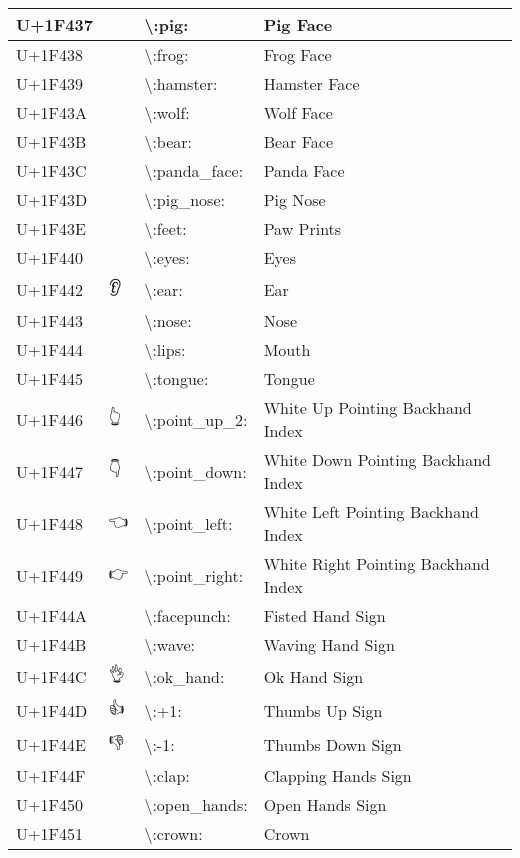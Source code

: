 \begin{table}[h]
\begin{tabulary}{\linewidth}{|L|L|L|L|}
\hline
U+1F437 & 🐷 & {\textbackslash}:pig: & Pig Face \\
\hline
U+1F438 & 🐸 & {\textbackslash}:frog: & Frog Face \\
\hline
U+1F439 & 🐹 & {\textbackslash}:hamster: & Hamster Face \\
\hline
U+1F43A & 🐺 & {\textbackslash}:wolf: & Wolf Face \\
\hline
U+1F43B & 🐻 & {\textbackslash}:bear: & Bear Face \\
\hline
U+1F43C & 🐼 & {\textbackslash}:panda\_face: & Panda Face \\
\hline
U+1F43D & 🐽 & {\textbackslash}:pig\_nose: & Pig Nose \\
\hline
U+1F43E & 🐾 & {\textbackslash}:feet: & Paw Prints \\
\hline
U+1F440 & 👀 & {\textbackslash}:eyes: & Eyes \\
\hline
U+1F442 & 👂 & {\textbackslash}:ear: & Ear \\
\hline
U+1F443 & 👃 & {\textbackslash}:nose: & Nose \\
\hline
U+1F444 & 👄 & {\textbackslash}:lips: & Mouth \\
\hline
U+1F445 & 👅 & {\textbackslash}:tongue: & Tongue \\
\hline
U+1F446 & 👆 & {\textbackslash}:point\_up\_2: & White Up Pointing Backhand Index \\
\hline
U+1F447 & 👇 & {\textbackslash}:point\_down: & White Down Pointing Backhand Index \\
\hline
U+1F448 & 👈 & {\textbackslash}:point\_left: & White Left Pointing Backhand Index \\
\hline
U+1F449 & 👉 & {\textbackslash}:point\_right: & White Right Pointing Backhand Index \\
\hline
U+1F44A & 👊 & {\textbackslash}:facepunch: & Fisted Hand Sign \\
\hline
U+1F44B & 👋 & {\textbackslash}:wave: & Waving Hand Sign \\
\hline
U+1F44C & 👌 & {\textbackslash}:ok\_hand: & Ok Hand Sign \\
\hline
U+1F44D & 👍 & {\textbackslash}:+1: & Thumbs Up Sign \\
\hline
U+1F44E & 👎 & {\textbackslash}:-1: & Thumbs Down Sign \\
\hline
U+1F44F & 👏 & {\textbackslash}:clap: & Clapping Hands Sign \\
\hline
U+1F450 & 👐 & {\textbackslash}:open\_hands: & Open Hands Sign \\
\hline
U+1F451 & 👑 & {\textbackslash}:crown: & Crown \\

\end{tabulary}
\end{table}
